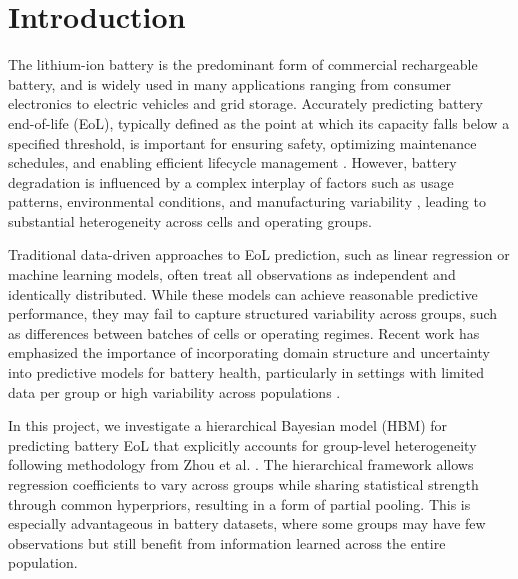 \section{Introduction}

The lithium-ion battery is the predominant form of commercial rechargeable battery, and is widely used in many applications ranging from consumer electronics to electric vehicles and grid storage. Accurately predicting battery end-of-life (EoL), typically defined as the point at which its capacity falls below a specified threshold, is important for ensuring safety, optimizing maintenance schedules, and enabling efficient lifecycle management \cite{Ahwiadireview2025}. However, battery degradation is influenced by a complex interplay of factors such as usage patterns, environmental conditions, and manufacturing variability \cite{HAN2019100005}, leading to substantial heterogeneity across cells and operating groups.

Traditional data-driven approaches to EoL prediction, such as linear regression or machine learning models, often treat all observations as independent and identically distributed. While these models can achieve reasonable predictive performance, they may fail to capture structured variability across groups, such as differences between batches of cells or operating regimes. Recent work has emphasized the importance of incorporating domain structure and uncertainty into predictive models for battery health, particularly in settings with limited data per group or high variability across populations \cite{severson2019}.

In this project, we investigate a hierarchical Bayesian model (HBM) for predicting battery EoL that explicitly accounts for group-level heterogeneity following methodology from Zhou et al. \cite{ZHOU20236117}. The hierarchical framework allows regression coefficients to vary across groups while sharing statistical strength through common hyperpriors, resulting in a form of partial pooling. This is especially advantageous in battery datasets, where some groups may have few observations but still benefit from information learned across the entire population.